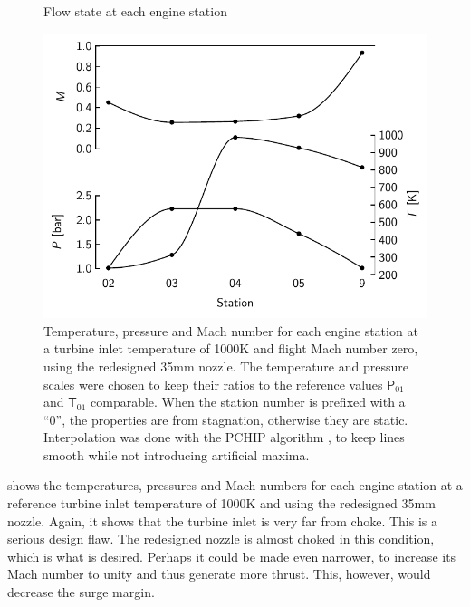\begin{figure}
    \caption{Flow state at each engine station}
    \label{fig:stations}
    \includegraphics{fig/stations1000K}
    \caption*{Temperature, pressure and Mach number for each engine station at a turbine inlet temperature of 1000K and flight Mach number zero, using the redesigned 35mm nozzle. The temperature and pressure scales were chosen to keep their ratios to the reference values $\mathsf P_{01}$ and $\mathsf T_{01}$ comparable. When the station number is prefixed with a ``0'', the properties are from stagnation, otherwise they are static. Interpolation was done with the PCHIP algorithm \cite{Fritsch1980}, to keep lines smooth while not introducing artificial maxima.}
\end{figure}

 shows the temperatures, pressures and Mach numbers for each engine station at a reference turbine inlet temperature of 1000K and using the redesigned 35mm nozzle.
Again, it shows that the turbine inlet is very far from choke. This is a serious design flaw. The redesigned nozzle is almost choked in this condition, which is what is desired. Perhaps it could be made even narrower, to increase its Mach number to unity and thus generate more thrust. This, however, would decrease the surge margin.



